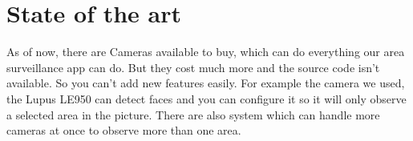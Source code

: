 \section[State of the art - Team]{State of the art}
As of now, there are Cameras available to buy, which can do everything our area surveillance app can do. But they cost much more and the source code isn’t available. So you can’t add new features easily. For example the camera we used, the Lupus LE950 can detect faces and you can configure it so it will only observe a selected area in the picture. There are also system which can handle more cameras at once to observe more than one area.

